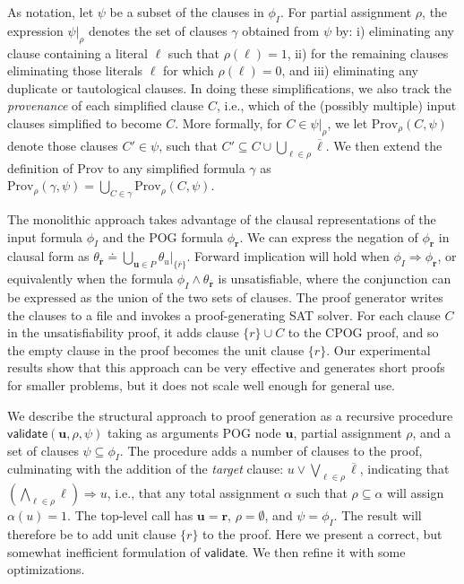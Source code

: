 \documentclass[letterpaper,USenglish,cleveref, autoref, thm-restate]{lipics-v2021}
\newcommand{\obar}[1]{\overline{#1}}
\newcommand{\lit}{\ell}
\newcommand{\imply}{\Rightarrow}
\newcommand{\assign}{\alpha}
\newcommand{\passign}{\rho}
\newcommand{\validate}{\textsf{validate}}
\newcommand{\prov}{\textrm{Prov}}
\newcommand{\inputformula}{\phi_I}
\newcommand{\makenode}[1]{\mathbf{#1}}
\newcommand{\nodeu}{\makenode{u}}
\newcommand{\noder}{\makenode{r}}
\newcommand{\simplify}[2]{#1|_{#2}}
\begin{document}
As notation,
let $\psi$ be a subset of the clauses in $\inputformula$.
For partial assignment
$\passign$, the expression  $\simplify{\psi}{\passign}$ denotes the set of clauses $\gamma$
obtained from $\psi$ by: i) eliminating any
clause containing a literal $\lit$ such that $\passign(\lit) = 1$,
ii) for the remaining clauses eliminating those literals $\lit$ for
which $\passign(\lit) = 0$, and iii) eliminating any duplicate or tautological clauses.
In doing these simplifications, we also track the \emph{provenance}
of each simplified clause $C$, i.e., which of the (possibly multiple) input clauses simplified to become $C$.
More formally, for $C \in \simplify{\psi}{\passign}$, we let $\prov_{\passign}(C, \psi)$ denote
those clauses $C' \in \psi$, such that
$C' \subseteq C \cup \bigcup_{\lit \in \passign} \obar{\lit}$.
We then extend the definition of $\prov$ to any simplified formula
$\gamma$ as $\prov_{\passign}(\gamma, \psi) = \bigcup_{C \in \gamma} \prov_{\passign}(C, \psi)$.

The monolithic approach
takes advantage of the clausal representations of
the input formula $\inputformula$ and the POG formula $\phi_\noder$.
We can express the negation of $\phi_\noder$ in clausal form as
$\theta_{\obar{\noder}} \doteq \bigcup_{\nodeu\in P} \simplify{\theta_{u}}{\{\obar{r}\}}$.
Forward implication will hold when $\inputformula \imply \phi_\noder$, or  equivalently
when the formula $\inputformula \land \theta_{\obar{\noder}}$
is unsatisfiable, where the
conjunction can be expressed as the union
of the two sets of clauses.  The proof generator writes the clauses to a file and invokes a proof-generating SAT solver.
For each clause $C$ in the unsatisfiability proof, it adds clause $\{r\} \cup C$ to the CPOG proof, and so the empty clause in the proof becomes the unit clause $\{r\}$.
Our experimental results show
that this approach can be very effective and generates short proofs
for smaller problems, but it does not scale well enough for general
use.


We describe the structural approach to proof generation as a recursive procedure
$\validate(\nodeu, \passign, \psi)$ taking as arguments POG
node $\nodeu$, partial assignment
$\passign$, and a set of clauses $\psi \subseteq \inputformula$.
The procedure adds a number of clauses to the proof, culminating with
the addition of the \emph{target} clause:
$u \lor \bigvee_{\lit \in \passign} \obar{\lit}$, indicating
that $(\bigwedge_{\lit \in \passign} \lit) \imply u$, i.e.,
that any total
assignment $\assign$ such that $\passign \subseteq \assign$
will assign $\assign(u) = 1$.
The top-level call has $\nodeu = \noder$, $\passign = \emptyset$, and $\psi = \inputformula$.
The result will therefore be to add unit clause $\{r\}$ to the proof.
Here we present a correct, but somewhat inefficient formulation of
$\validate$.  We then refine it with some optimizations.
\end{document}
